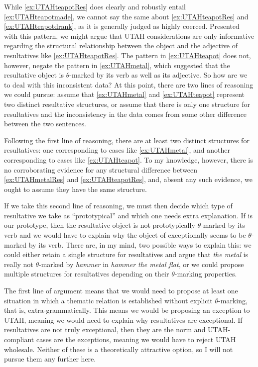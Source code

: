 While \cref{ex:UTAHteapotRes} does clearly and robustly entail \cref{ex:UTAHteapotmade}, we cannot say the same about \cref{ex:UTAHteapotRes} and \cref{ex:UTAHteapotdrank}, as it is generally judged as highly coerced.
Presented with this pattern, we might argue that UTAH considerations are only informative regarding the structural relationship between the object and the adjective of resultatives like \cref{ex:UTAHteapotRes}.
The pattern in \cref{ex:UTAHteapot} does not, however, negate the pattern in \cref{ex:UTAHmetal}, which suggested that the resultative object is $\theta$-marked by its verb as well as its adjective.
So how are we to deal with this inconsistent data?
At this point, there are two lines of reasoning we could pursue: assume that \cref{ex:UTAHmetal} and \cref{ex:UTAHteapot} represent two distinct resultative structures, or assume that there is only one structure for resultatives and the inconsistency in the data comes from some other difference between the two sentences. 

Following the first line of reasoning, there are at least two distinct structures for resultatives: one corresponding to cases like \cref{ex:UTAHmetal}, and another corresponding to cases like \cref{ex:UTAHteapot}.
To my knowledge, however, there is no corroborating evidence for any structural difference between \cref{ex:UTAHmetalRes} and \cref{ex:UTAHteapotRes}, and, absent any such evidence, we ought to assume they have the same structure.

If we take this second line of reasoning, we must then decide which type of resultative we take as ``prototypical'' and which one needs extra explanation.
If \Last[a] is our prototype, then the resultative object is not prototypically $\theta$-marked by its verb and we would have to explain why the object of \LLast[a] exceptionally seems to be $\theta$-marked by its verb.
There are, in my mind, two possible ways to explain this: we could either retain a single structure for resultatives and argue that \textit{the metal} is really not $\theta$-marked by \textit{hammer} in \textit{hammer the metal flat}, or we could propose multiple structures for resultatives depending on their $\theta$-marking properties.

The first line of argument means that we would need to propose at least one situation in which a thematic relation is established without explicit $\theta$-marking, that is, extra-grammatically.
This means we would be proposing an exception to UTAH, meaning we would need to explain why resultatives are exceptional.
If resultatives are not truly exceptional, then they are the norm and UTAH-compliant cases are the exceptions, meaning we would have to reject UTAH wholesale.
Neither of these is a theoretically attractive option, so I will not pursue them any further here.

